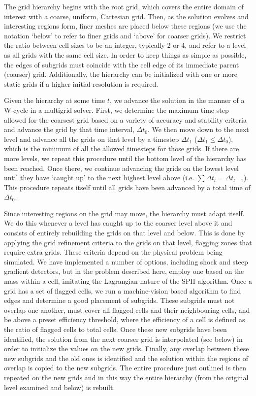 The grid hierarchy begins with the root grid, which covers the entire
domain of interest with a coarse, uniform, Cartesian grid. Then, as
the solution evolves and interesting regions form, finer meshes are
placed below these regions (we use the notation `below' to refer to
finer grids and `above' for coarser grids).  We restrict the ratio
between cell sizes to be an integer, typically 2 or 4, and refer to a
level as all grids with the same cell size.  In order to keep
things as simple as possible, the edges of subgrids must coincide with
the cell edge of its immediate parent (coarser) grid. Additionally,
the hierarchy can be initialized with one or more static grids if a
higher initial resolution is required.

Given the hierarchy at some time $t$, we advance the solution in the
manner of a W-cycle in a multigrid solver.  First, we determine the
maximum time step allowed for the coarsest grid based on a variety of
accuracy and stability criteria and advance the grid by that time
interval, $\Delta t_0$.  We then move down to the next level and
advance all the grids on that level by a timestep $\Delta t_1$
($\Delta t_1 \leq \Delta t_0$), which is the minimum of all the allowed
timesteps for those grids.  If there are more levels, we repeat this
procedure until the bottom level of the hierarchy has been reached.
Once there, we continue advancing the grids on the lowest level until
they have `caught up' to the next highest level above (i.e. $\sum
\Delta t_l = \Delta t_{l-1}$).  This procedure repeats itself until
all grids have been advanced by a total time of $\Delta t_0$.

Since interesting regions on the grid may move, the hierarchy must
adapt itself.  We do this whenever a level has caught up to the
coarser level above it and consists of entirely rebuilding the grids
on that level and below.  This is done by applying the grid refinement
criteria to the grids on that level, flagging zones that require
extra grids.  These criteria depend on the physical problem being
simulated.  We have implemented a number of options, including shock
and steep gradient detectors, but in the problem described here,
employ one based on the mass within a cell, imitating the Lagrangian
nature of the SPH algorithm.  Once a grid has a set of flagged cells,
we run a machine-vision based algorithm \citep{Berger91} to find edges
and determine a good placement of subgrids.  These subgrids must not
overlap one another, must cover all flagged cells and their
neighbouring cells, and be above a preset efficiency threshold, where
the efficiency of a cell is defined as the ratio of flagged cells to
total cells.  Once these new subgrids have been identified, the
solution from the next coarser grid is interpolated (see below) in
order to initialize the values on the new grids.  Finally, any overlap
between these new subgrids and the old ones is identified and the
solution within the regions of overlap is copied to the new subgrids.
The entire procedure just outlined is then repeated on the new grids
and in this way the entire hierarchy (from the original level examined
and below) is rebuilt.

